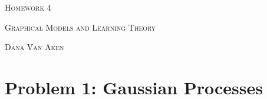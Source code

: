 \documentclass{article}
\begin{document}
\section*{}
\begin{center}
  \centerline{\textsc{\LARGE Homework 4}}
  \vspace{0.5em}
  \centerline{\textsc{Graphical Models and Learning Theory}}
  \vspace{1em}
  \textsc{\large Dana Van Aken} \\
\end{center}

\section*{Problem 1: Gaussian Processes}
\end{document}
